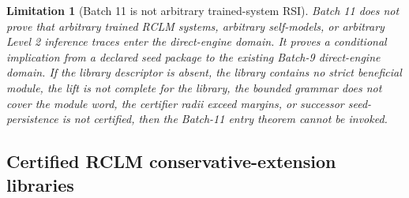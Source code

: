 \documentclass[11pt,a4paper]{article}
\newtheorem{limitation}[theorem]{Limitation}
\begin{document}
\begin{limitation}[Batch 11 is not arbitrary trained-system RSI]
Batch 11 does not prove that arbitrary trained RCLM systems, arbitrary self-models, or arbitrary Level 2 inference traces enter the direct-engine domain.  It proves a conditional implication from a declared seed package to the existing Batch-9 direct-engine domain.  If the library descriptor is absent, the library contains no strict beneficial module, the lift is not complete for the library, the bounded grammar does not cover the module word, the certifier radii exceed margins, or successor seed-persistence is not certified, then the Batch-11 entry theorem cannot be invoked.
\end{limitation}

\subsection{Certified RCLM conservative-extension libraries}
\end{document}
